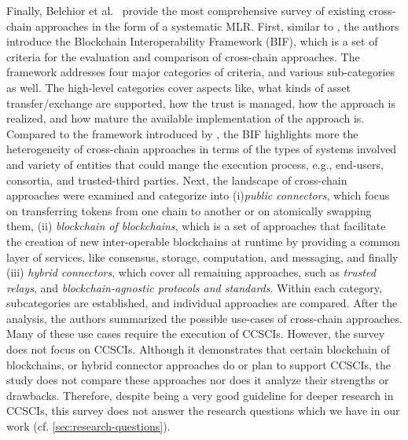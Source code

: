 \documentclass[review]{elsarticle}
\begin{document}
Finally, Belchior et al.~\cite{belchior2020survey} provide the most comprehensive survey of existing cross-chain approaches in the form of a systematic MLR.
First, similar to \cite{Koens2019Assessing}, the authors introduce the Blockchain Interoperability Framework (BIF), which is a set of criteria for the evaluation and comparison of cross-chain approaches.
The framework addresses four major categories of criteria, and various sub-categories as well.
The high-level categories cover aspects like, what kinds of asset transfer/exchange are supported, how the trust is managed, how the approach is realized, and how mature the available implementation of the approach is.
Compared to the framework introduced by \cite{Koens2019Assessing}, the BIF highlights more the heterogeneity of cross-chain approaches in terms of the types of systems involved and variety of entities that could mange the execution process, e.g., end-users, consortia, and trusted-third parties.
Next, the landscape of cross-chain approaches were examined and categorize into (i)\textit{public connectors}, which focus on transferring tokens from one chain to another or on atomically swapping them, (ii) \textit{blockchain of blockchains}, which is a set of approaches that facilitate the creation of new inter-operable blockchains at runtime by providing a common layer of services, like consensus, storage, computation, and messaging, and finally (iii) \textit{hybrid connectors}, which cover all remaining approaches, such as \textit{trusted relays}, and \textit{blockchain-agnostic protocols and standards}.
Within each category, subcategories are established, and individual approaches are compared.
After the analysis, the authors summarized the possible use-cases of cross-chain approaches.
Many of these use cases require the execution of CCSCIs. 
However, the survey does not focus on CCSCIs.
Although it demonstrates that certain blockchain of blockchains, or hybrid connector approaches do or plan to support CCSCIs, the study does not compare these approaches nor does it analyze their strengths or drawbacks.
Therefore, despite being a very good guideline for deeper research in CCSCIs, this survey does not answer the research questions which we have in our work (cf. \cref{sec:research-questions}).
\end{document}
